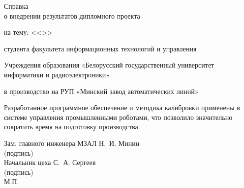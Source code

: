 \thispagestyle{empty}

\begin{center}
    Справка \\[0.5em]
    
    о внедрении результатов дипломного проекта 
    
    на тему: <<\topicName>> 
    
    студента факультета информационных технологий и управления 
    
    Учреждения образования «Белорусский государственный университет информатики и радиоэлектроники»
    
    \fio
    
    в производство на РУП «Минский завод автоматических линий»
\end{center}

Разработанное программное обеспечение и методика калибровки применены в системе управления промышленными роботами, что позволило значительно сократить время на подготовку производства.

\vspace{2cm}

\begin{flushleft}
   Зам. главного инженера МЗАЛ \hspace{2em} \uline{\hspace*{8em}} \hspace{2em} Н.~И. Минин\\ [-0.25em]
   {\footnotesize\hspace{9.5cm}(подпись)}\\[1em]
   
   Начальник цеха \hspace{9em} \uline{\hspace*{8em}} \hspace{2em} С.~А. Сергеев\\ [-0.25em]
   {\footnotesize\hspace{9.5cm}(подпись)}\\

   М.П.
\end{flushleft}